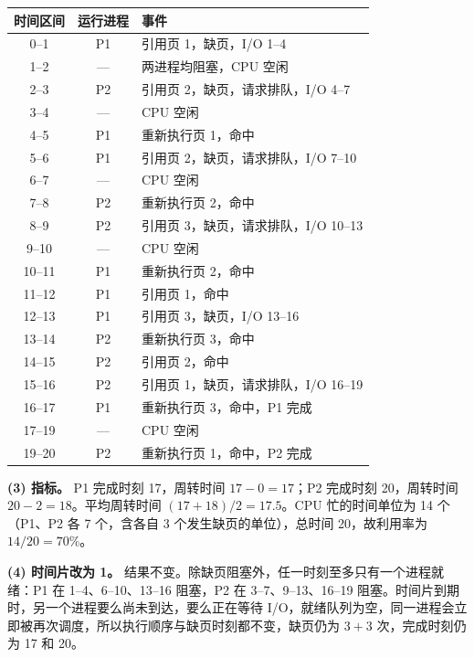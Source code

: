 \begin{enumerate}[resume]
\begin{center}
\small
\begin{tabular}{|c|c|l|}
\hline
时间区间 & 运行进程 & 事件 \\
\hline
0--1 & P1 & 引用页 1，缺页，I/O 1--4 \\
1--2 & --- & 两进程均阻塞，CPU 空闲 \\
2--3 & P2 & 引用页 2，缺页，请求排队，I/O 4--7 \\
3--4 & --- & CPU 空闲 \\
4--5 & P1 & 重新执行页 1，命中 \\
5--6 & P1 & 引用页 2，缺页，请求排队，I/O 7--10 \\
6--7 & --- & CPU 空闲 \\
7--8 & P2 & 重新执行页 2，命中 \\
8--9 & P2 & 引用页 3，缺页，请求排队，I/O 10--13 \\
9--10 & --- & CPU 空闲 \\
10--11 & P1 & 重新执行页 2，命中 \\
11--12 & P1 & 引用页 1，命中 \\
12--13 & P1 & 引用页 3，缺页，I/O 13--16 \\
13--14 & P2 & 重新执行页 3，命中 \\
14--15 & P2 & 引用页 2，命中 \\
15--16 & P2 & 引用页 1，缺页，请求排队，I/O 16--19 \\
16--17 & P1 & 重新执行页 3，命中，P1 完成 \\
17--19 & --- & CPU 空闲 \\
19--20 & P2 & 重新执行页 1，命中，P2 完成 \\
\hline
\end{tabular}
\end{center}

\textbf{(3) 指标。} P1 完成时刻 17，周转时间 $17-0=17$；P2 完成时刻 20，周转时间 $20-2=18$。平均周转时间 $(17+18)/2=17.5$。CPU 忙的时间单位为 14 个（P1、P2 各 7 个，含各自 3 个发生缺页的单位），总时间 20，故利用率为 $14/20=70\%$。

\textbf{(4) 时间片改为 1。} 结果不变。除缺页阻塞外，任一时刻至多只有一个进程就绪：P1 在 1--4、6--10、13--16 阻塞，P2 在 3--7、9--13、16--19 阻塞。时间片到期时，另一个进程要么尚未到达，要么正在等待 I/O，就绪队列为空，同一进程会立即被再次调度，所以执行顺序与缺页时刻都不变，缺页仍为 $3+3$ 次，完成时刻仍为 17 和 20。\par\noindent{}\else \answerarea[16] \fi


\end{enumerate}
